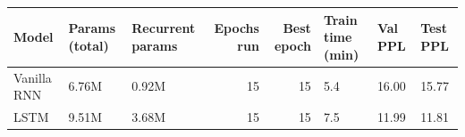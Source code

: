 \begin{tabular}{lllrrlll}
\toprule
Model & Params (total) & Recurrent params & Epochs run & Best epoch & Train time (min) & Val PPL & Test PPL \\
\midrule
Vanilla RNN & 6.76M & 0.92M & 15 & 15 & 5.4 & 16.00 & 15.77 \\
LSTM & 9.51M & 3.68M & 15 & 15 & 7.5 & 11.99 & 11.81 \\
\bottomrule
\end{tabular}
